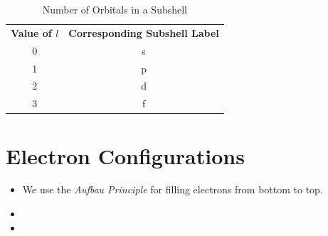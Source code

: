 \documentclass[
	chapter=7,
	title={Quantum Theory {\&} the Electronic Structure of Atoms},
	showanswers=true,
]{chem122notes}
\begin{document}
\begin{table}[H]
	\centering
	\caption{Number of Orbitals in a Subshell}
	\label{tab:subshell-orbitals}
	\begin{tabular}{cc}
		\textbf{Value of $l$} & \textbf{Corresponding Subshell Label}\\
		0 & s\\
		1 & p\\
		2 & d\\
		3 & f\\
	\end{tabular}
\end{table}

\section{Electron Configurations}\label{sec:electron-configurations}
\begin{itemize}
	\item We use the \emph{Aufbau Principle} for filling electrons from bottom to top.
	\item {}
	\item {}
\end{itemize}
\end{document}
